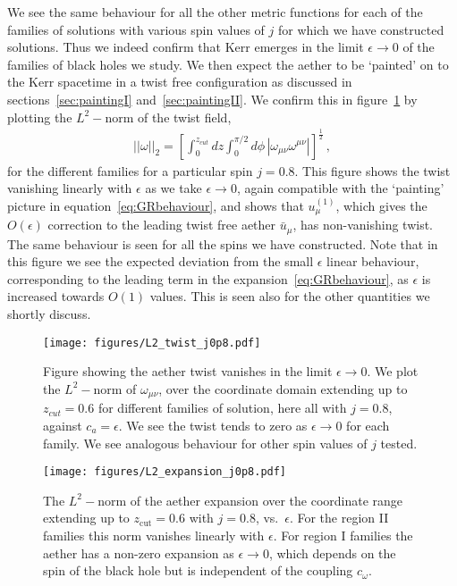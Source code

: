 \documentclass[12pt]{article}
\numberwithin{equation}{section}
\begin{document}
We see the same behaviour for all the other metric functions  for each of the families of solutions with various spin values of $j$ for which we have constructed solutions. Thus we indeed confirm that Kerr emerges in the limit $\epsilon \to 0$ of the families of black holes we study.
We then expect the aether to be `painted' on to the Kerr spacetime in a twist free configuration as discussed in sections~\ref{sec:paintingI} and~\ref{sec:paintingII}. 
We confirm this in figure~\ref{fig:aetherTwist} by plotting the $L^2-$norm of the twist field,
\begin{eqnarray}
|| {\omega} ||_2 = \left[ \int_0^{z_{cut}} dz \int_0^{\pi/2} d\phi\, | \omega_{\mu\nu} \omega^{\mu\nu} |\right]^\frac{1}{2}\, ,
\end{eqnarray}
for the different families for a particular spin $j=0.8$. This figure  shows the twist vanishing linearly with $\epsilon$ as we take $\epsilon \to 0$, again compatible with the `painting' picture in equation~\eqref{eq:GRbehaviour}, and shows that $u^{(1)}_\mu$, which gives the $O(\epsilon)$ correction to the leading twist free aether  $\bar{u}_\mu$,  has non-vanishing twist. The same behaviour is seen for all the spins we have constructed. Note that
in this figure we see the expected deviation from the small $\epsilon$ linear behaviour, corresponding to the leading term in the expansion~\eqref{eq:GRbehaviour}, as $\epsilon$ is increased towards $O(1)$ values. This is seen also for the other quantities we shortly discuss.


\begin{figure}
\centerline{  
\texttt{[image: figures/L2\_twist\_j0p8.pdf]} 
}
  \caption{\label{fig:aetherTwist}
  Figure showing the aether twist vanishes in the limit $\epsilon \to 0$.
  We plot the $L^2-$norm of $\omega_{\mu\nu}$, over the coordinate domain extending up to $z_{cut}=0.6$ for different families of solution, here all with $j = 0.8$, against $c_a = \epsilon$. We see the twist tends to zero as $\epsilon \to 0$ for each family. 
  We see analogous behaviour for other spin values of $j$ tested.
  } 
\end{figure}


\begin{figure}
\centerline{  
  \texttt{[image: figures/L2\_expansion\_j0p8.pdf]}
  }
  \caption{\label{fig:aetherExpansion}
  The $L^2-$norm of the aether expansion over the coordinate range extending up to $z_\textrm{cut}=0.6$ with $j=0.8$, vs.\  $\epsilon$. For the region II families this norm vanishes linearly with $\epsilon$. For region I families the aether has a non-zero expansion  as $\epsilon\to 0$, which depends on the spin of the black hole  but is independent of the  coupling $c_\omega$.} 
\end{figure}
\end{document}

